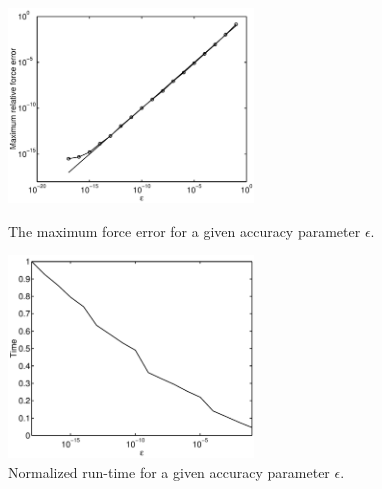 \documentclass[11pt]{article}
\begin{document}
\begin{figure}[htb]
\begin{minipage}{6.6cm}
  \centerline{\includegraphics[width=6.5cm]{relativemaxerror.pdf}}
  \caption{The maximum force error for a given accuracy parameter $\epsilon$.\label{fig:relativemaxerror}}
\end{minipage}
\hfill
\begin{minipage}{6.6cm}
  \centerline{\includegraphics[width=6.5cm]{timmeaccuracy.pdf}}
  \caption{Normalized run-time  for a given accuracy
  parameter $\epsilon$.\label{fig:timmeaccuracy}}
\end{minipage}
\end{figure}
\end{document}
